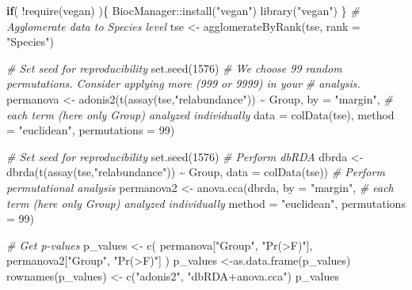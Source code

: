\documentclass[
]{book}
\newenvironment{Shaded}{\begin{snugshade}}{\end{snugshade}}
\newcommand{\AttributeTok}[1]{\textcolor[rgb]{0.77,0.63,0.00}{#1}}
\newcommand{\CommentTok}[1]{\textcolor[rgb]{0.56,0.35,0.01}{\textit{#1}}}
\newcommand{\ControlFlowTok}[1]{\textcolor[rgb]{0.13,0.29,0.53}{\textbf{#1}}}
\newcommand{\DecValTok}[1]{\textcolor[rgb]{0.00,0.00,0.81}{#1}}
\newcommand{\FunctionTok}[1]{\textcolor[rgb]{0.00,0.00,0.00}{#1}}
\newcommand{\NormalTok}[1]{#1}
\newcommand{\OtherTok}[1]{\textcolor[rgb]{0.56,0.35,0.01}{#1}}
\newcommand{\SpecialCharTok}[1]{\textcolor[rgb]{0.00,0.00,0.00}{#1}}
\newcommand{\StringTok}[1]{\textcolor[rgb]{0.31,0.60,0.02}{#1}}
\begin{document}
\begin{Shaded}
\begin{Highlighting}[]
\ControlFlowTok{if}\NormalTok{( }\SpecialCharTok{!}\FunctionTok{require}\NormalTok{(vegan) )\{}
\NormalTok{    BiocManager}\SpecialCharTok{::}\FunctionTok{install}\NormalTok{(}\StringTok{"vegan"}\NormalTok{)}
    \FunctionTok{library}\NormalTok{(}\StringTok{"vegan"}\NormalTok{)}
\NormalTok{\}}
\CommentTok{\# Agglomerate data to Species level}
\NormalTok{tse }\OtherTok{\textless{}{-}} \FunctionTok{agglomerateByRank}\NormalTok{(tse, }\AttributeTok{rank =} \StringTok{"Species"}\NormalTok{)}

\CommentTok{\# Set seed for reproducibility}
\FunctionTok{set.seed}\NormalTok{(}\DecValTok{1576}\NormalTok{)}
\CommentTok{\# We choose 99 random permutations. Consider applying more (999 or 9999) in your}
\CommentTok{\# analysis. }
\NormalTok{permanova }\OtherTok{\textless{}{-}} \FunctionTok{adonis2}\NormalTok{(}\FunctionTok{t}\NormalTok{(}\FunctionTok{assay}\NormalTok{(tse,}\StringTok{"relabundance"}\NormalTok{)) }\SpecialCharTok{\textasciitilde{}}\NormalTok{ Group,}
                     \AttributeTok{by =} \StringTok{"margin"}\NormalTok{, }\CommentTok{\# each term (here only \textquotesingle{}Group\textquotesingle{}) analyzed individually}
                     \AttributeTok{data =} \FunctionTok{colData}\NormalTok{(tse),}
                     \AttributeTok{method =} \StringTok{"euclidean"}\NormalTok{,}
                     \AttributeTok{permutations =} \DecValTok{99}\NormalTok{)}

\CommentTok{\# Set seed for reproducibility}
\FunctionTok{set.seed}\NormalTok{(}\DecValTok{1576}\NormalTok{)}
\CommentTok{\# Perform dbRDA}
\NormalTok{dbrda }\OtherTok{\textless{}{-}} \FunctionTok{dbrda}\NormalTok{(}\FunctionTok{t}\NormalTok{(}\FunctionTok{assay}\NormalTok{(tse,}\StringTok{"relabundance"}\NormalTok{)) }\SpecialCharTok{\textasciitilde{}}\NormalTok{ Group, }
               \AttributeTok{data =} \FunctionTok{colData}\NormalTok{(tse))}
\CommentTok{\# Perform permutational analysis}
\NormalTok{permanova2 }\OtherTok{\textless{}{-}} \FunctionTok{anova.cca}\NormalTok{(dbrda,}
                        \AttributeTok{by =} \StringTok{"margin"}\NormalTok{, }\CommentTok{\# each term (here only \textquotesingle{}Group\textquotesingle{}) analyzed individually}
                        \AttributeTok{method =} \StringTok{"euclidean"}\NormalTok{,}
                        \AttributeTok{permutations =} \DecValTok{99}\NormalTok{)}

\CommentTok{\# Get p{-}values}
\NormalTok{p\_values }\OtherTok{\textless{}{-}} \FunctionTok{c}\NormalTok{( permanova[}\StringTok{"Group"}\NormalTok{, }\StringTok{"Pr(\textgreater{}F)"}\NormalTok{], permanova2[}\StringTok{"Group"}\NormalTok{, }\StringTok{"Pr(\textgreater{}F)"}\NormalTok{] )}
\NormalTok{p\_values }\OtherTok{\textless{}{-}}\FunctionTok{as.data.frame}\NormalTok{(p\_values)}
\FunctionTok{rownames}\NormalTok{(p\_values) }\OtherTok{\textless{}{-}} \FunctionTok{c}\NormalTok{(}\StringTok{"adonis2"}\NormalTok{, }\StringTok{"dbRDA+anova.cca"}\NormalTok{)}
\NormalTok{p\_values}
\end{Highlighting}
\end{Shaded}
\end{document}
